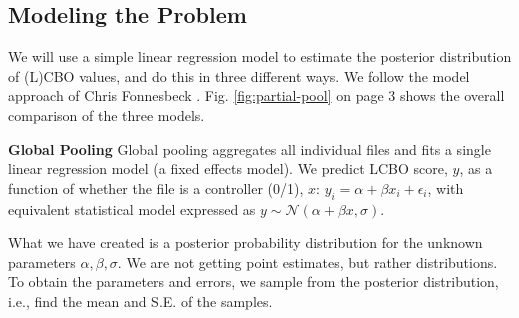 \documentclass[sigconf,natbib=false]{acmart}
\begin{document}


\subsection{Modeling the Problem}
We will use a simple linear regression model to estimate the posterior
distribution of (L)CBO values, and do this in three different ways. We follow
the model approach of Chris Fonnesbeck \cite{fonnesbeck2016}. Fig.
\ref{fig:partial-pool} on page 3 shows the overall comparison of the three
models.

\noindent\textbf{Global Pooling}
Global pooling aggregates all individual files and fits a single linear
regression model (a fixed effects model). We predict LCBO score, $y$, as a
function of whether the file is a controller (0/1), $x$: $ y_i = \alpha + \beta
x_i + \epsilon_i$, with equivalent statistical model expressed as $y \sim \mathcal{N}(\alpha
+ \beta x, \sigma)$.

What we have created is a posterior probability distribution for the unknown
parameters $\alpha, \beta, \sigma$. We are not getting point estimates, but
rather distributions. To obtain the parameters and errors, we sample from the
posterior distribution, i.e., find the mean and S.E. of the samples.

\end{document}
